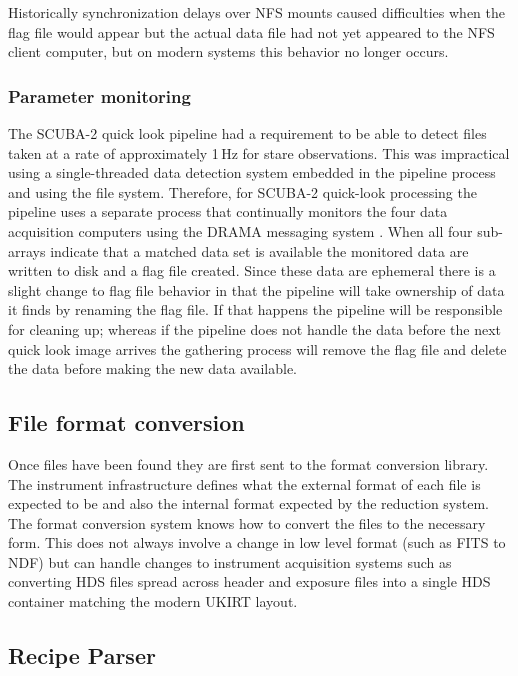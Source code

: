 \documentclass[final,authoryear,5p,times,twocolumn]{elsarticle}
\begin{document}
Historically synchronization delays over NFS mounts caused
difficulties when the flag file would appear but the actual data file
had not yet appeared to the NFS client computer, but on modern systems
this behavior no longer occurs.

\subsubsection{Parameter monitoring}

The SCUBA-2 quick look pipeline \citep{2005ASPC..347..585G} had a
requirement to be able to detect files taken at a rate of
approximately 1\,Hz for stare observations. This was impractical using
a single-threaded data detection system embedded in the pipeline process and
using the file system. Therefore, for SCUBA-2 quick-look processing the
pipeline uses a separate process that continually monitors the
four data acquisition computers using the DRAMA messaging system
\citep{1995SPIE.2479...62B}. When all four sub-arrays indicate that a
matched data set is available the monitored data are written to disk
and a flag file created. Since these data are ephemeral there is a
slight change to flag file behavior in that the pipeline will take
ownership of data it finds by renaming the flag file. If that happens
the pipeline will be responsible for cleaning up; whereas if the
pipeline does not handle the data before the next quick look image
arrives the gathering process will remove the flag file and delete the
data before making the new data available.

\subsection{File format conversion}

Once files have been found they are first sent to the format
conversion library. The instrument infrastructure defines what the
external format of each file is expected to be and also the internal format
expected by the reduction system. The format conversion system knows
how to convert the files to the necessary form. This does not always
involve a change in low level format (such as FITS to NDF) but can
handle changes to instrument acquisition systems such as converting
HDS files spread across header and exposure files into a single HDS
container matching the modern UKIRT layout.

\subsection{Recipe Parser}
\end{document}
